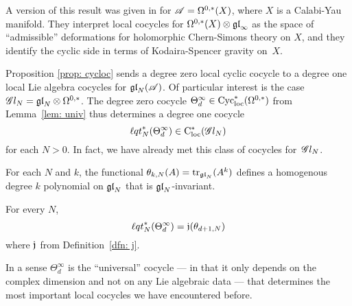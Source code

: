 \begin{rmk}
A version of this result was given in \cite{CL1} for $\mathscr A = \Omega^{0,*}(X)$, 
where $X$ is a Calabi-Yau manifold.
They interpret local cocycles for $\Omega^{0,*}(X) \otimes {\mathfrak{gl}}_\infty$ as the space of ``admissible'' deformations for holomorphic Chern-Simons theory on $X$,
and they identify the cyclic side in terms of Kodaira-Spencer gravity on~$X$.
\end{rmk}

Proposition \ref{prop: cycloc} sends a degree zero local cyclic cocycle to a degree one local Lie algebra cocycles for ${\mathfrak{gl}}_N(\mathscr A)$.
Of particular interest is the case $\mathscr G l_{N} = {\mathfrak{gl}}_N \otimes \Omega^{0,*}$. 
The degree zero cocycle $\Theta_d^\infty \in {\rm Cyc}_{\rm loc}^*(\Omega^{0,*})$ from Lemma~\ref{lem: univ} thus determines a degree one cocycle 
\[
{\ell q t}^*_N(\Theta_d^\infty) \in {\rm C}_{\rm loc}^*(\mathscr G l_N)
\]
for each $N > 0$. 
In fact, we have already met this class of cocycles for~$\mathscr G l_{N}$. 

\begin{dfn}
For each $N$ and $k$, the functional $\theta_{k,N}(A) = {\rm tr}_{{\mathfrak{gl}}_N} (A^k)$ defines a homogenous degree $k$ polynomial on ${\mathfrak{gl}}_N$ that is ${\mathfrak{gl}}_N$-invariant.
\end{dfn}

\begin{lem}
\label{lem:pullbackofthetainfinity}
For every $N$, 
\[
{\ell q t}_N^*(\Theta_d^\infty) = \mathfrak j(\theta_{d+1, N})
\]
where $\mathfrak j$ from Definition~\ref{dfn: j}.
\end{lem}

In a sense $\Theta^\infty_d$ is the ``universal'' cocycle --- in that it only depends on the complex dimension and not on any Lie algebraic data --- that determines the most important local cocycles we have encountered before.


